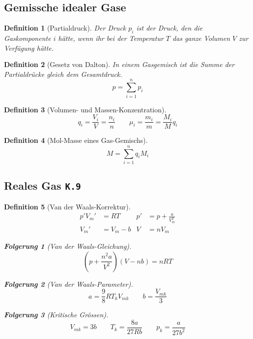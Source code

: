 \documentclass[a4paper, twocolumn]{article}
\numberwithin{equation}{section}
\theoremstyle{hsr-def}
\newtheorem{definition}{Definition}[section]
\theoremstyle{hsr-sub}
\newtheorem{result}{Folgerung}[definition]
\newcommand{\fromlecture}[1]{\textcolor{red!70!black}{\small\texttt{K.#1}}}
\begin{document}
\subsection{Gemissche idealer Gase}
\begin{definition}[Partialdruck]
Der Druck \(p_i\) ist der Druck, den die Gaskomponente \(i\) h\"atte, wenn ihr bei der Temperatur \(T\) das ganze Volumen \(V\) zur Verf\"ugung h\"atte.
\end{definition}

\begin{definition}[Gesetz von Dalton]
In einem Gasgemisch ist die Summe der Partialdr\"ucke gleich dem Gesamtdruck.
\[
    p = \sum_{i = 1}^n p_i
\]
\end{definition}

\begin{definition}[Volumen- und Massen-Konzentration]
\[
    q_i = \frac{V_i}{V} = \frac{n_i}{n}
    \qquad
    \mu_i = \frac{m_i}{m} = \frac{M_i}{M} q_i
\]
\end{definition}

\begin{definition}[Mol-Masse eines Gas-Gemischs]
\[
    M = \sum_{i = 1}^n q_i M_i
\]
\end{definition}

\subsection{Reales Gas \fromlecture{9}}
\begin{definition}[Van der Waals-Korrektur]
\begin{align*}
    p'V_m' & = RT      & p' & = p + \frac{a}{V_m^2} \\
    V_m'   & = V_m - b & V  & = nV_m
\end{align*}

\begin{result}[Van der Waals-Gleichung]
\[
    \left(p + \frac{n^2 a}{V^2} \right)(V - nb) = nRT
\]
\end{result}

\begin{result}[Van der Waals-Parameter]
\[
    a = \frac{9}{8} R T_k V_{mk}
    \qquad
    b = \frac{V_{mk}}{3}
\]
\end{result}

\begin{result}[Kritische Gr\"ossen]
\[
    V_{mk} = 3b
    \qquad
    T_k = \frac{8a}{27Rb}
    \qquad
    p_k = \frac{a}{27b^2}
\]
\end{result}
\end{definition}
\end{document}
